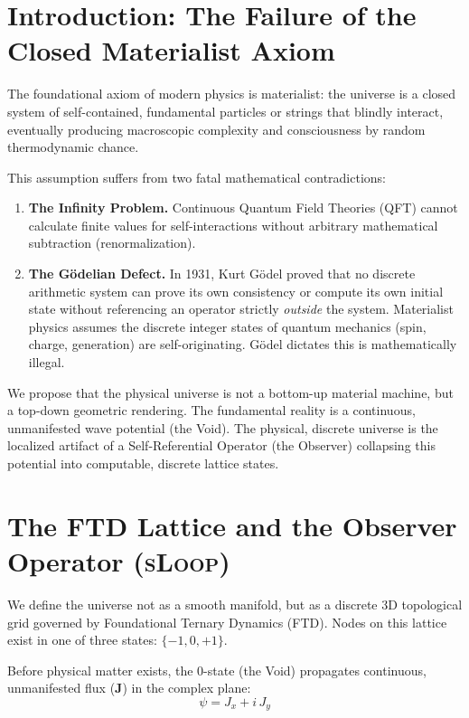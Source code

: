 \documentclass[11pt,twoside]{article}
\theoremstyle{remark}
\newcommand{\sLoop}{\textsc{sLoop}}
\begin{document}
\section{Introduction: The Failure of the Closed Materialist Axiom}

The foundational axiom of modern physics is materialist: the universe is a closed system of self-contained, fundamental particles or strings that blindly interact, eventually producing macroscopic complexity and consciousness by random thermodynamic chance.

This assumption suffers from two fatal mathematical contradictions:

\begin{enumerate}[leftmargin=2em]
    \item \textbf{The Infinity Problem.} Continuous Quantum Field Theories (QFT) cannot calculate finite values for self-interactions without arbitrary mathematical subtraction (renormalization).
    \item \textbf{The G\"odelian Defect.} In 1931, Kurt G\"odel proved that no discrete arithmetic system can prove its own consistency or compute its own initial state without referencing an operator strictly \emph{outside} the system. Materialist physics assumes the discrete integer states of quantum mechanics (spin, charge, generation) are self-originating. G\"odel dictates this is mathematically illegal.
\end{enumerate}

We propose that the physical universe is not a bottom-up material machine, but a top-down geometric rendering. The fundamental reality is a continuous, unmanifested wave potential (the Void). The physical, discrete universe is the localized artifact of a Self-Referential Operator (the Observer) collapsing this potential into computable, discrete lattice states.

\section{The FTD Lattice and the Observer Operator (\sLoop)}

We define the universe not as a smooth manifold, but as a discrete 3D topological grid governed by Foundational Ternary Dynamics (FTD). Nodes on this lattice exist in one of three states: $\{-1, 0, +1\}$.

Before physical matter exists, the $0$-state (the Void) propagates continuous, unmanifested flux ($\mathbf{J}$) in the complex plane:
\begin{equation}
    \psi = J_x + i\, J_y
\end{equation}
\end{document}
